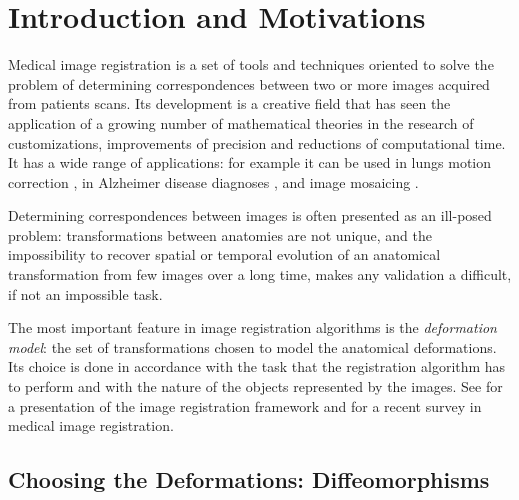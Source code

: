 \chapter{Introduction and Motivations}\label{ch:introduction}


%


Medical image registration is a set of tools and techniques oriented to solve the problem of determining correspondences between two or more images acquired from patients scans. Its development is a creative field that has seen the application of a growing number of mathematical theories in the research of customizations, improvements of precision and reductions of computational time. It has a wide range of applications: for example it can be used in lungs motion correction \cite{mcclelland,mcclelland2011inter}, in Alzheimer disease diagnoses \cite{prados2015measuring, fox1997brain, gauthier2012prevention}, and image mosaicing \cite{vercauteren2006robust, szeliski1994image}.  

Determining correspondences between images is often presented as an ill-posed problem: transformations between anatomies are not unique, and the impossibility to recover spatial or temporal evolution of an anatomical transformation from few images over a long time, makes any validation a difficult, if not an impossible task. 

The most important feature in image registration algorithms is the \emph{deformation model}: the set of transformations chosen to model the anatomical deformations. Its choice is done in accordance with the task that the registration algorithm has to perform and with the nature of the objects represented by the images. See \cite{ibanez2003itk} for a presentation of the image registration framework and \cite{Sotiras:survey:13} for a recent survey in medical image registration. 

\section{Choosing the Deformations: Diffeomorphisms}

